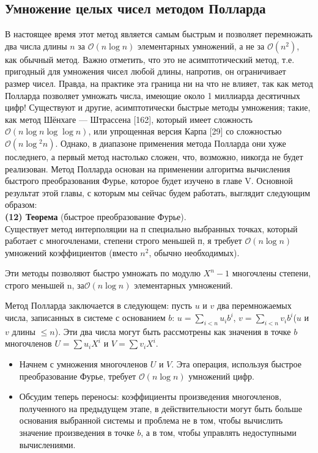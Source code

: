 \subsection{Умножение целых чисел методом Полларда}
В настоящее время этот метод является самым быстрым и позволяет
перемножать два числа длины $n$ за $\mathcal{O}(n\log{}n)$ элементарных 
умножений, а не за $\mathcal{O}(n^{2})$, как обычный метод. Важно отметить, что это не асимптотический метод, т.е. пригодный для умножения чисел любой
длины, напротив, он ограничивает размер чисел. Правда, на 
практике эта граница ни на что не влияет, так как метод Полларда 
позволяет умножать числа, имеющие около 1 миллиарда десятичных цифр!
Существуют и другие, асимптотически быстрые методы умножения;
такие, как метод Шёнхаге — Штрассена [162], который имеет 
сложность $\mathcal{O}(n\log{}n\log{}\log{}n)$, или упрощенная версия Карпа [29] со сложностью $\mathcal{O}(n\log{}^{2}n)$. Однако, в диапазоне применения метода Полларда они хуже последнего, а первый метод настолько сложен, что, возможно, никогда не будет реализован.
\pagebreak
\newpage
Метод Полларда основан на применении алгоритма вычисления 
быстрого преобразования Фурье, которое будет изучено в главе V. 
Основной результат этой главы, с которым мы сейчас будем работать, 
выглядит следующим образом: \\
\textbf{(12) Теорема} (быстрое преобразование Фурье).\\
Существует метод интерполяции на п специально выбранных 
точках, который работает с многочленами, степени строго меньшей п, я
требует $\mathcal{O}(n\log{}n)$ умножений коэффициентов (вместо $n^{2}$, обычно необходимых).\par
Эти методы позволяют быстро умножать по модулю $X^{n} - 1$ 
многочлены степени, строго меньшей n, за$\mathcal{O}(n\log{}n)$ элементарных 
умножений.\par
 Метод Полларда заключается в следующем: пусть $u$ и $v$ два 
перемножаемых числа, записанных в системе с основанием $b$: $u = \sum_{i<n}u_{i}b^{i}$, $v = \sum_{i < n}v_{i}b^{i}$($u$ и $v$ длины $\leq n$). Эти два числа могут быть рассмотрены как значения в точке $b$ многочленов $U = \sum u_{i}X^{i}$ и $V = \sum v_{i}X^{i}$.
\begin{itemize}
\item Начнем с умножения многочленов $U$ и $V$. Эта операция, 
используя быстрое преобразование Фурье, требует $\mathcal{O}(n\log{}n)$  умножений цифр.
\item Обсудим теперь переносы: коэффициенты произведения 
многочленов, полученного на предыдущем этапе, в действительности
могут быть больше основания выбранной системы и проблема не
в том, чтобы вычислить значение произведения в точке $b$, а в том,
чтобы управлять недоступными вычислениями.
\end{itemize}

